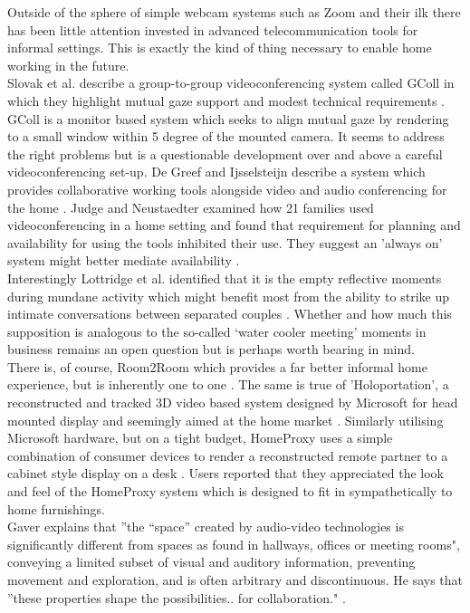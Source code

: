 Outside of the sphere of simple webcam systems such as Zoom and their ilk there has been little attention invested in advanced telecommunication tools for informal settings. This is exactly the kind of thing necessary to enable home working in the future.\\
Slovak et al. describe a group-to-group videoconferencing system called GColl in which they highlight mutual gaze support and modest technical requirements \cite{Slovak2009}. GColl is a monitor based system which seeks to align mutual gaze by rendering to a small window within 5 degree of the mounted camera. It seems to address the right problems but is a questionable development over and above a careful videoconferencing set-up. De Greef and Ijsselsteijn describe a system which provides collaborative working tools alongside video and audio conferencing for the home \cite{DeGreef2001}. Judge and Neustaedter examined how 21 families used videoconferencing in a home setting and found that requirement for planning and availability for using the tools inhibited their use. They suggest an 'always on' system might better mediate availability \cite{Judge2010}. \\
Interestingly Lottridge et al. identified that it is the empty reflective moments during mundane activity which might benefit most from the ability to strike up intimate conversations between separated couples \cite{Lottridge2009}. Whether and how much this supposition is analogous to the so-called `water cooler meeting' moments in business remains an open question but is perhaps worth bearing in mind.\\
There is, of course, Room2Room which provides a far better informal home experience, but is inherently one to one \cite{Pejsa2016}. The same is true of 'Holoportation', a reconstructed and tracked 3D video based system designed by Microsoft for head mounted display and seemingly aimed at the home market \cite{orts2016holoportation}. Similarly utilising Microsoft hardware, but on a tight budget, HomeProxy uses a simple combination of consumer devices to render a reconstructed remote partner to a cabinet style display on a desk \cite{Tang2013}. Users reported that they appreciated the look and feel of the HomeProxy system which is designed to fit in sympathetically to home furnishings.\\
Gaver explains that ''the “space” created by audio-video technologies is significantly different from spaces as found in hallways, offices or meeting rooms", conveying a limited subset of visual and auditory information, preventing movement and exploration, and is often arbitrary and discontinuous. He says that ''these properties shape the possibilities.. for collaboration." \cite{Gaver1992}.\\
